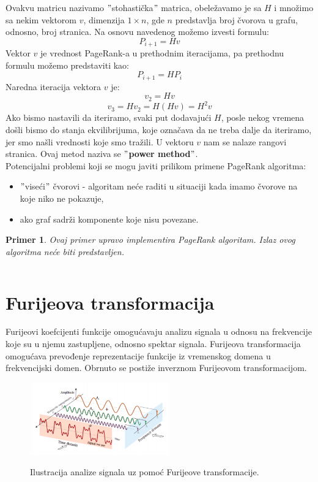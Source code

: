 \documentclass[a4paper]{article}
\newtheorem{primer}{Primer}[section]
\begin{document}
Ovakvu matricu nazivamo $"$stohastička$"$ matrica, obeležavamo je sa $H$ i množimo sa nekim vektorom $v$, dimenzija $1 \times n$, gde $n$ predstavlja broj čvorova u grafu, odnosno, broj stranica. Na osnovu navedenog možemo izvesti formulu:
\begin{equation}
P_{i+1} = Hv
\end{equation}
Vektor $v$ je vrednost PageRank-a u prethodnim iteracijama, pa prethodnu formulu možemo predstaviti kao:
\begin{equation}
P_{i+1} = HP_i
\end{equation}
Naredna iteracija vektora $v$ je:
\begin{equation}
v_2 = Hv
\end{equation}
\begin{equation}
v_3 = Hv_2 = H(Hv) = H^2v
\end{equation}
Ako bismo nastavili da iteriramo, svaki put dodavajući $H$, posle nekog vremena došli bismo do stanja ekvilibrijuma, koje označava da ne treba dalje da iteriramo, jer smo našli vrednosti koje smo tražili. U vektoru $v$ nam se nalaze rangovi stranica. Ovaj metod naziva se \textbf{$"$power method$"$}.\\
Potencijalni problemi koji se mogu javiti prilikom primene PageRank algoritma:
\begin{itemize}
\item $"$viseći$"$ čvorovi - algoritam neće raditi u situaciji kada imamo čvorove na koje niko ne pokazuje,
\item ako graf sadrži komponente koje nisu povezane.
\end{itemize} 
\begin{primer} 
Ovaj primer upravo implementira PageRank algoritam. Izlaz ovog algoritma neće biti predstavljen.
\inputminted{python}{Codes/2/3-pagerank.py}
\end{primer}
\newpage
\section{Furijeova transformacija}
Furijeovi koefcijenti funkcije omogućavaju analizu signala u odnosu na frekvencije
koje su u njemu zastupljene, odnosno spektar signala. Furijeova transformacija omogućava prevođenje reprezentacije funkcije iz vremenskog domena u
frekvencijski domen. Obrnuto se postiže inverznom Furijeovom transformacijom.
\begin{figure}[t]
\includegraphics[width=6cm]{Pictures/fourier.png}
\centering
\label{fig:fourier}
\caption{Ilustracija analize signala uz pomoć Furijeove transformacije.}
\end{figure}



\appendix
 

\end{document}
